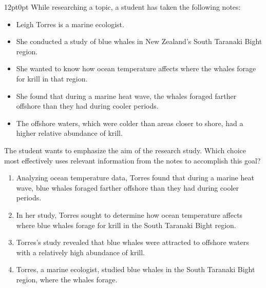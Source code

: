 \documentclass[11pt, twocolumn]{article}
\newcounter{questionnum}
\begin{document}
\vspace{6pt}\noindent
\begin{minipage}{\columnwidth}\raggedright
\noindent{}\par\vspace{8pt}
\begin{adjustwidth}{12pt}{0pt}
While researching a topic, a student has taken the following notes:

\begin{itemize}

\item Leigh Torres is a marine ecologist.

\item She conducted a study of blue whales in New Zealand's South Taranaki Bight region.

\item She wanted to know how ocean temperature affects where the whales forage for krill in that region.

\item She found that during a marine heat wave, the whales foraged farther offshore than they had during cooler periods.

\item The offshore waters, which were colder than areas closer to shore, had a higher relative abundance of krill.

\end{itemize}
\vspace{6pt}

The student wants to emphasize the aim of the research study. Which choice most effectively uses relevant information from the notes to accomplish this goal?
\begin{enumerate}[label=\Alph*),leftmargin=18pt,topsep=3pt,itemsep=2pt]
  \item Analyzing ocean temperature data, Torres found that during a marine heat wave, blue whales foraged farther offshore than they had during cooler periods.
  \item In her study, Torres sought to determine how ocean temperature affects where blue whales forage for krill in the South Taranaki Bight region.
  \item Torres's study revealed that blue whales were attracted to offshore waters with a relatively high abundance of krill.
  \item Torres, a marine ecologist, studied blue whales in the South Taranaki Bight region, where the whales forage.
\end{enumerate}
\end{adjustwidth}
\end{minipage}\par
\end{document}
